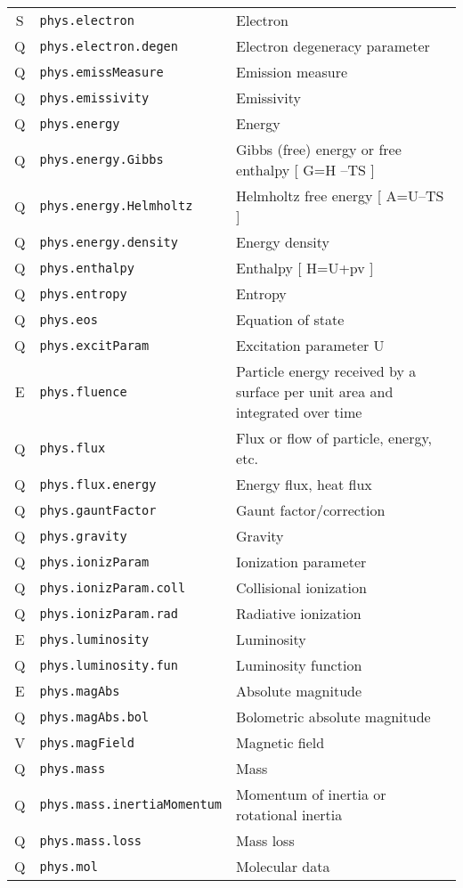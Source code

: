 \documentclass[11pt,a4paper]{ivoa}
\begin{document}
\begin{longtable}[h!]{c|p{40ex}|p{}}
S & {\tt phys.electron} & Electron\\
Q & {\tt phys.electron.degen} & Electron degeneracy parameter\\
Q & {\tt phys.emissMeasure} & Emission measure\\
Q & {\tt phys.emissivity} & Emissivity\\
Q & {\tt phys.energy} & Energy\\
Q & {\tt phys.energy.Gibbs} & Gibbs (free) energy or free enthalpy   [ G=H –TS ]\\
Q & {\tt phys.energy.Helmholtz} & Helmholtz free energy [ A=U–TS ]\\
Q & {\tt phys.energy.density} & Energy density\\
Q & {\tt phys.enthalpy} & Enthalpy  [ H=U+pv ]\\
Q & {\tt phys.entropy} & Entropy\\
Q & {\tt phys.eos} & Equation of state\\
Q & {\tt phys.excitParam} & Excitation parameter U\\
E & {\tt phys.fluence} & Particle energy received  by a surface per unit area and integrated over time\\
Q & {\tt phys.flux} & Flux or flow of particle, energy, etc.\\
Q & {\tt phys.flux.energy} & Energy flux, heat flux\\
Q & {\tt phys.gauntFactor} & Gaunt factor/correction\\
Q & {\tt phys.gravity} & Gravity\\
Q & {\tt phys.ionizParam} & Ionization parameter\\
Q & {\tt phys.ionizParam.coll} & Collisional ionization\\
Q & {\tt phys.ionizParam.rad} & Radiative ionization\\
E & {\tt phys.luminosity} & Luminosity\\
Q & {\tt phys.luminosity.fun} & Luminosity function\\
E & {\tt phys.magAbs} & Absolute magnitude\\
Q & {\tt phys.magAbs.bol} & Bolometric absolute magnitude\\
V & {\tt phys.magField} & Magnetic field\\
Q & {\tt phys.mass} & Mass\\
Q & {\tt phys.mass.inertiaMomentum} & Momentum of inertia or rotational inertia\\
Q & {\tt phys.mass.loss} & Mass loss\\
Q & {\tt phys.mol} & Molecular data\\

\end{longtable}
\end{document}
